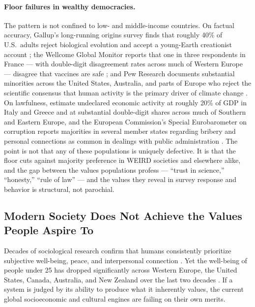 \documentclass{article}
\theoremstyle{plain}
\theoremstyle{definition}
\theoremstyle{remark}
\begin{document}
\paragraph{Floor failures in wealthy democracies.}
The pattern is not confined to low- and middle-income countries. On factual accuracy, Gallup's long-running origins survey finds that roughly 40\% of U.S.\ adults reject biological evolution and accept a young-Earth creationist account \citep{gallup2019creation}; the Wellcome Global Monitor reports that one in three respondents in France --- with double-digit disagreement rates across much of Western Europe --- disagree that vaccines are safe \citep{wellcome2018monitor}; and Pew Research documents substantial minorities across the United States, Australia, and parts of Europe who reject the scientific consensus that human activity is the primary driver of climate change \citep{pew2023climate}. On lawfulness, \citet{medina2018shadow} estimate undeclared economic activity at roughly 20\% of GDP in Italy and Greece and at substantial double-digit shares across much of Southern and Eastern Europe, and the European Commission's Special Eurobarometer on corruption reports majorities in several member states regarding bribery and personal connections as common in dealings with public administration \citep{eurobarometer2022corruption}. The point is not that any of these populations is uniquely defective. It is that the floor cuts against majority preference in WEIRD societies and elsewhere alike, and the gap between the values populations profess --- ``trust in science,'' ``honesty,'' ``rule of law'' --- and the values they reveal in survey response and behavior is structural, not parochial.

\subsection{Modern Society Does Not Achieve the Values People Aspire To}
Decades of sociological research confirm that humans consistently prioritize subjective well-being, peace, and interpersonal connection \citep{gallup-emotional-health}. Yet the well-being of people under 25 has dropped significantly across Western Europe, the United States, Canada, Australia, and New Zealand over the last two decades \citep{whr2026, haidt2024anxious}. If a system is judged by its ability to produce what it inherently values, the current global socioeconomic and cultural engines are failing on their own merits.
\end{document}
